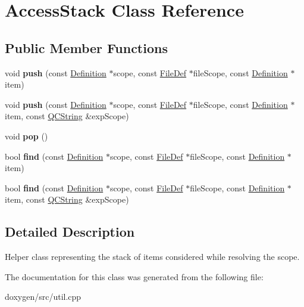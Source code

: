 \hypertarget{class_access_stack}{}\section{Access\+Stack Class Reference}
\label{class_access_stack}
\subsection*{Public Member Functions}
\begin{DoxyCompactItemize}
\item 
\mbox{\label{class_access_stack_aa6044b906f049112dc68aff47e91d4a7}} 
void {\bfseries push} (const \mbox{\hyperlink{class_definition}{Definition}} $\ast$scope, const \mbox{\hyperlink{class_file_def}{File\+Def}} $\ast$file\+Scope, const \mbox{\hyperlink{class_definition}{Definition}} $\ast$item)
\item 
\mbox{\label{class_access_stack_af3ea2969a085e4a2074bb8375f289ebb}} 
void {\bfseries push} (const \mbox{\hyperlink{class_definition}{Definition}} $\ast$scope, const \mbox{\hyperlink{class_file_def}{File\+Def}} $\ast$file\+Scope, const \mbox{\hyperlink{class_definition}{Definition}} $\ast$item, const \mbox{\hyperlink{class_q_c_string}{Q\+C\+String}} \&exp\+Scope)
\item 
\mbox{\label{class_access_stack_a3cd93006259acc5edf0cad527c3935bb}} 
void {\bfseries pop} ()
\item 
\mbox{\label{class_access_stack_a9d144e56b75159f1bba48c299fb0a1ee}} 
bool {\bfseries find} (const \mbox{\hyperlink{class_definition}{Definition}} $\ast$scope, const \mbox{\hyperlink{class_file_def}{File\+Def}} $\ast$file\+Scope, const \mbox{\hyperlink{class_definition}{Definition}} $\ast$item)
\item 
\mbox{\label{class_access_stack_a6ff480efc6c9a78ad023c0933fc44197}} 
bool {\bfseries find} (const \mbox{\hyperlink{class_definition}{Definition}} $\ast$scope, const \mbox{\hyperlink{class_file_def}{File\+Def}} $\ast$file\+Scope, const \mbox{\hyperlink{class_definition}{Definition}} $\ast$item, const \mbox{\hyperlink{class_q_c_string}{Q\+C\+String}} \&exp\+Scope)
\end{DoxyCompactItemize}


\subsection{Detailed Description}
Helper class representing the stack of items considered while resolving the scope. 

The documentation for this class was generated from the following file\+:\begin{DoxyCompactItemize}
\item 
doxygen/src/util.\+cpp\end{DoxyCompactItemize}
